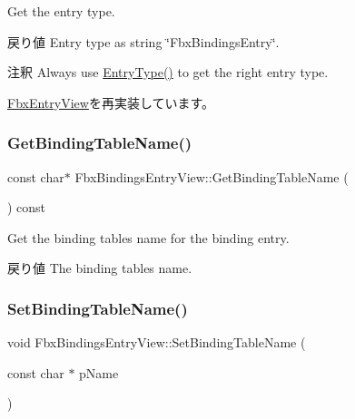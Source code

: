 Get the entry type. \begin{DoxyReturn}{戻り値}
Entry type as string \char`\"{}\+Fbx\+Bindings\+Entry\char`\"{}. 
\end{DoxyReturn}
\begin{DoxyRemark}{注釈}
Always use \hyperlink{class_fbx_bindings_entry_view_a25f821ea63f19592173e7785356c04f9}{Entry\+Type()} to get the right entry type. 
\end{DoxyRemark}


\hyperlink{class_fbx_entry_view_a83ee50482b441ba8b0e6d7c2dba5432f}{Fbx\+Entry\+View}を再実装しています。

\mbox{\label{class_fbx_bindings_entry_view_a1b3909ebdbe0164c910056526eedcdc6}} 
\subsubsection{\texorpdfstring{Get\+Binding\+Table\+Name()}{GetBindingTableName()}}
{\footnotesize\ttfamily const char$\ast$ Fbx\+Bindings\+Entry\+View\+::\+Get\+Binding\+Table\+Name (\begin{DoxyParamCaption}{ }\end{DoxyParamCaption}) const}

Get the binding table\textquotesingle{}s name for the binding entry. \begin{DoxyReturn}{戻り値}
The binding table\textquotesingle{}s name. 
\end{DoxyReturn}
\mbox{\label{class_fbx_bindings_entry_view_af367ef628865d839cc034acf224ffe78}} 
\subsubsection{\texorpdfstring{Set\+Binding\+Table\+Name()}{SetBindingTableName()}}
{\footnotesize\ttfamily void Fbx\+Bindings\+Entry\+View\+::\+Set\+Binding\+Table\+Name (\begin{DoxyParamCaption}\item[{const char $\ast$}]{p\+Name }\end{DoxyParamCaption})}

